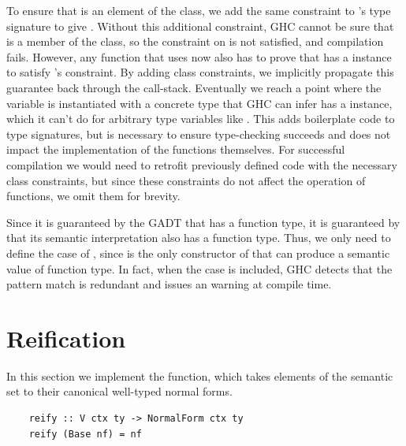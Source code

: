 To ensure that  is an element of the  class, we add the same constraint to 's type signature to give . 
Without this additional constraint, GHC cannot be sure that  is a member of the  class, so the constraint on  is not satisfied, and compilation fails. However, any function that uses  now also has to prove that  has a  instance to satisfy 's constraint. By adding class constraints, we implicitly propagate this guarantee back through the call-stack. Eventually we reach a point where the  variable is instantiated with a concrete type that GHC can infer has a  instance, which it can't do for arbitrary type variables like . This adds boilerplate code to type signatures, but is necessary to ensure type-checking succeeds and does not impact the implementation of the functions themselves. For successful compilation we would need to retrofit previously defined code with the necessary class constraints, but since these constraints do not affect the operation of functions, we omit them for brevity.


Since it is guaranteed by the  GADT that  has a function type, it is guaranteed by  that its semantic interpretation  also has a function type. Thus, we only need to define the  case of , since  is the only constructor of  that can produce a semantic value of function type. In fact, when the  case is included, GHC detects that the pattern match is redundant and issues an  warning at compile time. 


\section{Reification}

In this section we implement the  function, which takes elements of the semantic set to their canonical well-typed normal forms. 

\begin{lstlisting}
    reify :: V ctx ty -> NormalForm ctx ty
    reify (Base nf) = nf
\end{lstlisting}

